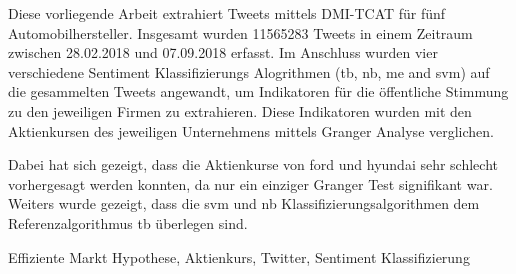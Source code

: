Diese vorliegende Arbeit extrahiert Tweets mittels DMI-TCAT für fünf Automobilhersteller.
Insgesamt wurden 11565283 Tweets in einem Zeitraum zwischen 28.02.2018 und 07.09.2018 erfasst.
Im Anschluss wurden vier verschiedene Sentiment Klassifizierungs Alogrithmen (tb, nb, me and svm) auf die gesammelten Tweets angewandt, um Indikatoren für die öffentliche Stimmung zu den jeweiligen Firmen zu extrahieren.
Diese Indikatoren wurden mit den Aktienkursen des jeweiligen Unternehmens mittels Granger Analyse verglichen.

Dabei hat sich gezeigt, dass die Aktienkurse von ford und hyundai sehr schlecht vorhergesagt werden konnten, da nur ein einziger Granger Test signifikant war.
Weiters wurde gezeigt, dass die svm und nb Klassifizierungsalgorithmen dem Referenzalgorithmus tb überlegen sind.

\SomeSpace
{}
\normalsize
\noindent
Effiziente Markt Hypothese, Aktienkurs, Twitter, Sentiment Klassifizierung

\glsresetall
